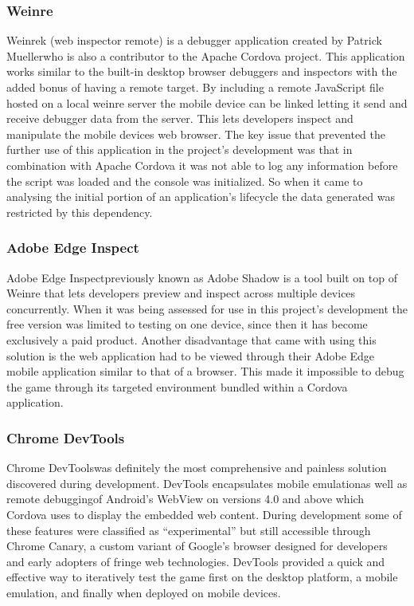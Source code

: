 \documentclass[final]{cmpreport}
\begin{document}
{

\subsubsection{Weinre}
Weinre\footnotemar[37]k (web inspector remote) is a debugger application created by Patrick Mueller\footnotemark[38] who is also a contributor to the Apache Cordova project. This application works similar to the built-in desktop browser debuggers and inspectors with the added bonus of having a remote target. By including a remote JavaScript file hosted on a local weinre server the mobile device can be linked letting it send and receive debugger data from the server. This lets developers inspect and manipulate the mobile devices web browser. The key issue that prevented the further use of this application in the project's development was that in combination with Apache Cordova it was not able to log any information before the script was loaded and the console was initialized. So when it came to analysing the initial portion of an application's lifecycle the data generated was restricted by this dependency.


\subsubsection{Adobe Edge Inspect}
Adobe Edge Inspect\footnotemark[39] previously known as Adobe Shadow is a tool built on top of Weinre that lets developers preview and inspect across multiple devices concurrently. 
When it was being assessed for use in this project's development the free version was limited to testing on one device, since then it has become exclusively a paid product. Another disadvantage that came with using this solution is the web application had to be viewed through their Adobe Edge mobile application similar to that of a browser. This made it impossible to debug the game through its targeted environment bundled within a Cordova application.


\subsubsection{Chrome DevTools}
Chrome DevTools\footnotemark[40] was definitely the most comprehensive and painless solution discovered during development. DevTools encapsulates mobile emulation\footnotemark[41] as well as remote debugging\footnotemark[42] of Android's WebView on versions 4.0 and above which Cordova uses to display the embedded web content. During development some of these features were classified as ``experimental'' but still accessible through Chrome Canary\footnotemark[43], a custom variant of Google's browser designed for developers and early adopters of fringe web technologies. DevTools provided a quick and effective way to iteratively test the game first on the desktop platform, a mobile emulation, and finally when deployed on mobile devices.

}
\end{document}
